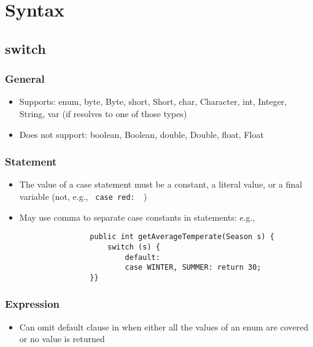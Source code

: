 \documentclass{scrartcl}
\begin{document}
\section{Syntax}
\subsection{switch}

\subsubsection{General}

        \begin{itemize}
            \item Supports: enum, byte, Byte, short, Short, char, Character, int, Integer,
            String, var (if resolves to one of those types)
            \item Does not support: boolean, Boolean, double, Double, float, Float
         \end{itemize}

\subsubsection{Statement}

    \begin{itemize}
        \item The value of a case statement must be a constant, a literal value, or a final variable (not, e.g., \lstinline$ case red:  $)
        \item May use comma to separate case constants in statements: e.g.,
            \begin{lstlisting}
                public int getAverageTemperate(Season s) {
                    switch (s) {
                        default:
                        case WINTER, SUMMER: return 30;
                }}
            \end{lstlisting}
    \end{itemize}

\subsubsection{Expression}

    \begin{itemize}
        \item Can omit default clause in when either all the values of an enum are covered or no value is returned
    \end{itemize}
\end{document}
